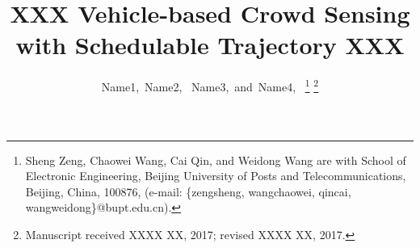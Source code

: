 \documentclass[journal]{IEEEtran}
\begin{document}
%
\title{XXX Vehicle-based Crowd Sensing with Schedulable Trajectory  XXX }
%
%
%

\author{Name1,~Name2,~
	    Name3,~and~Name4,~
\thanks{Sheng Zeng, Chaowei Wang, Cai Qin, and Weidong Wang are with School of Electronic Engineering, Beijing University of Posts and Telecommunications, Beijing, China, 100876, (e-mail: \{zengsheng, wangchaowei, qincai, wangweidong\}@bupt.edu.cn).}%
\thanks{Manuscript received XXXX XX, 2017; revised XXXX XX, 2017.}}

% 
%



% 
\end{document}
